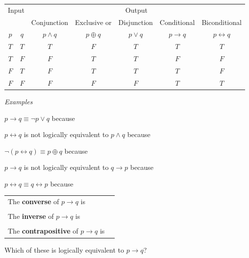 \documentclass[12pt, oneside]{article}
\begin{document}
\vfill

\begin{center}
\begin{tabular}{cc||c|c|c|c|c}
\multicolumn{2}{c||}{Input}  & \multicolumn{5}{c}{Output} \\
 & & Conjunction &  Exclusive or & Disjunction  &  Conditional & Biconditional  \\
$p$ & $q$ & $p \wedge q$ &  $p  \oplus  q$ & $p \vee  q$ & $p \to q$ & $p \leftrightarrow q$\\
\hline
$T$ & $T$ & $T$ & $F$ & $T$ & $T$& $T$\\
$T$ & $F$ & $F$ & $T$ & $T$ & $F$& $F$\\
$F$ & $T$ & $F$ & $T$ & $T$ & $T$& $F$\\
$F$ & $F$ & $F$ & $F$ & $F$ & $T$& $T$\\
\end{tabular}
\end{center}

{\it Examples} 

$p \to q \equiv \lnot p \lor q$ because \underline{\phantom{\hspace{4in}}} 

\vfill

$p \leftrightarrow q$ is not logically equivalent to $p \land q$ because \underline{\phantom{\hspace{4in}}} 

\vfill

$\lnot( p \leftrightarrow q) \equiv p \oplus q$ because \underline{\phantom{\hspace{4in}}} 

\vfill


$p \to q$ is not logically equivalent to $q \to p$ because \underline{\phantom{\hspace{4in}}} 

\vfill

$p \leftrightarrow q \equiv q \leftrightarrow p$ because \underline{\phantom{\hspace{4in}}} 

\vfill

\begin{tabular}{ll}
The {\bf  converse}  of $p \to q$ is & \underline{\phantom{\hspace{1.6in}}}\\
&  \\
The {\bf  inverse}  of $p \to q$ is  &\underline{\phantom{\hspace{1.6in}}}\\
&  \\
The {\bf  contrapositive}  of $p \to q$ is & \underline{\phantom{\hspace{1.6in}}}
\end{tabular}
Which of these is logically equivalent to $p \to q$?
\end{document}

